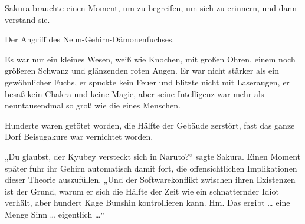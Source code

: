 Sakura brauchte einen Moment, um zu begreifen, um sich zu erinnern, und dann verstand sie.

Der Angriff des Neun-Gehirn-Dämonenfuchses.

Es war nur ein kleines Wesen, weiß wie Knochen, mit großen Ohren, einem noch größeren Schwanz und glänzenden roten Augen. Er war nicht stärker als ein gewöhnlicher Fuchs, er spuckte kein Feuer und blitzte nicht mit Laseraugen, er besaß kein Chakra und keine Magie, aber seine Intelligenz war mehr als neuntausendmal so groß wie die eines Menschen.

Hunderte waren getötet worden, die Hälfte der Gebäude zerstört, fast das ganze Dorf Beisugakure war vernichtet worden.

„Du glaubst, der Kyubey versteckt sich in Naruto?“ sagte Sakura. Einen Moment später fuhr ihr Gehirn automatisch damit fort, die offensichtlichen Implikationen dieser Theorie auszufüllen.
„Und der Softwarekonflikt zwischen ihren Existenzen ist der Grund, warum er sich die Hälfte der Zeit wie ein schnatternder Idiot verhält, aber hundert Kage Bunshin kontrollieren kann. Hm. Das ergibt … eine Menge Sinn … eigentlich …“

